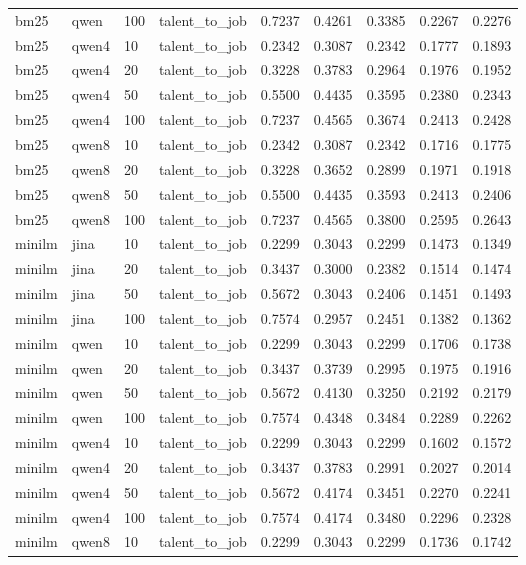 \begin{table}[t]
\begin{tabular}{lllllllll}
bm25 & qwen & 100 & talent_to_job & 0.7237 & 0.4261 & 0.3385 & 0.2267 & 0.2276 \\
bm25 & qwen4 & 10 & talent_to_job & 0.2342 & 0.3087 & 0.2342 & 0.1777 & 0.1893 \\
bm25 & qwen4 & 20 & talent_to_job & 0.3228 & 0.3783 & 0.2964 & 0.1976 & 0.1952 \\
bm25 & qwen4 & 50 & talent_to_job & 0.5500 & 0.4435 & 0.3595 & 0.2380 & 0.2343 \\
bm25 & qwen4 & 100 & talent_to_job & 0.7237 & 0.4565 & 0.3674 & 0.2413 & 0.2428 \\
bm25 & qwen8 & 10 & talent_to_job & 0.2342 & 0.3087 & 0.2342 & 0.1716 & 0.1775 \\
bm25 & qwen8 & 20 & talent_to_job & 0.3228 & 0.3652 & 0.2899 & 0.1971 & 0.1918 \\
bm25 & qwen8 & 50 & talent_to_job & 0.5500 & 0.4435 & 0.3593 & 0.2413 & 0.2406 \\
bm25 & qwen8 & 100 & talent_to_job & 0.7237 & 0.4565 & 0.3800 & 0.2595 & 0.2643 \\
minilm & jina & 10 & talent_to_job & 0.2299 & 0.3043 & 0.2299 & 0.1473 & 0.1349 \\
minilm & jina & 20 & talent_to_job & 0.3437 & 0.3000 & 0.2382 & 0.1514 & 0.1474 \\
minilm & jina & 50 & talent_to_job & 0.5672 & 0.3043 & 0.2406 & 0.1451 & 0.1493 \\
minilm & jina & 100 & talent_to_job & 0.7574 & 0.2957 & 0.2451 & 0.1382 & 0.1362 \\
minilm & qwen & 10 & talent_to_job & 0.2299 & 0.3043 & 0.2299 & 0.1706 & 0.1738 \\
minilm & qwen & 20 & talent_to_job & 0.3437 & 0.3739 & 0.2995 & 0.1975 & 0.1916 \\
minilm & qwen & 50 & talent_to_job & 0.5672 & 0.4130 & 0.3250 & 0.2192 & 0.2179 \\
minilm & qwen & 100 & talent_to_job & 0.7574 & 0.4348 & 0.3484 & 0.2289 & 0.2262 \\
minilm & qwen4 & 10 & talent_to_job & 0.2299 & 0.3043 & 0.2299 & 0.1602 & 0.1572 \\
minilm & qwen4 & 20 & talent_to_job & 0.3437 & 0.3783 & 0.2991 & 0.2027 & 0.2014 \\
minilm & qwen4 & 50 & talent_to_job & 0.5672 & 0.4174 & 0.3451 & 0.2270 & 0.2241 \\
minilm & qwen4 & 100 & talent_to_job & 0.7574 & 0.4174 & 0.3480 & 0.2296 & 0.2328 \\
minilm & qwen8 & 10 & talent_to_job & 0.2299 & 0.3043 & 0.2299 & 0.1736 & 0.1742 \\

\end{tabular}
\end{table}
